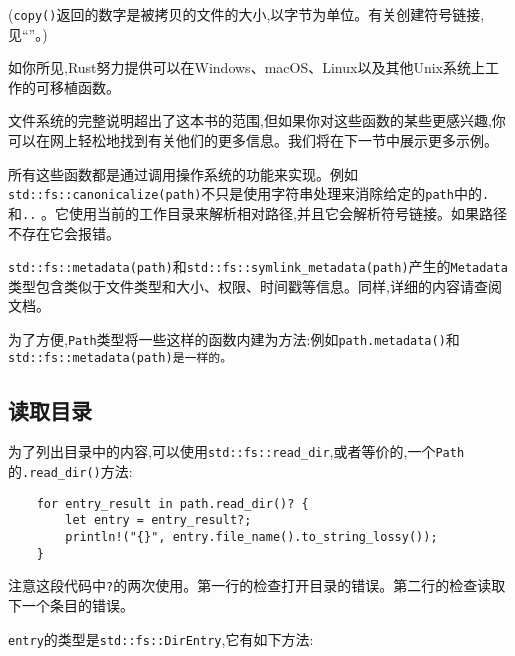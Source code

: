 (\texttt{copy()}返回的数字是被拷贝的文件的大小,以字节为单位。有关创建符号链接,见“”。)

如你所见,Rust努力提供可以在Windows、macOS、Linux以及其他Unix系统上工作的可移植函数。

文件系统的完整说明超出了这本书的范围,但如果你对这些函数的某些更感兴趣,你可以在网上轻松地找到有关他们的更多信息。我们将在下一节中展示更多示例。

所有这些函数都是通过调用操作系统的功能来实现。例如\texttt{std::fs::canonicalize(path)}不只是使用字符串处理来消除给定的\texttt{path}中的\texttt{.}和\texttt{..} 。它使用当前的工作目录来解析相对路径,并且它会解析符号链接。如果路径不存在它会报错。

\texttt{std::fs::metadata(path)}和\texttt{std::fs::symlink\_metadata(path)}产生的\texttt{Metadata}类型包含类似于文件类型和大小、权限、时间戳等信息。同样,详细的内容请查阅文档。

为了方便,\texttt{Path}类型将一些这样的函数内建为方法:例如\texttt{path.metadata()}和\texttt{std::fs::metadata(path)是一样的。}

\subsection{读取目录}
为了列出目录中的内容,可以使用\texttt{std::fs::read\_dir},或者等价的,一个\texttt{Path}的\texttt{.read\_dir()}方法:
\begin{verbatim}
    for entry_result in path.read_dir()? {
        let entry = entry_result?;
        println!("{}", entry.file_name().to_string_lossy());
    }
\end{verbatim}

注意这段代码中\texttt{?}的两次使用。第一行的检查打开目录的错误。第二行的检查读取下一个条目的错误。

\texttt{entry}的类型是\texttt{std::fs::DirEntry},它有如下方法:



